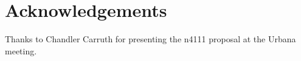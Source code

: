 \section{Acknowledgements}

Thanks to Chandler Carruth for presenting the n4111 proposal at the Urbana meeting.
